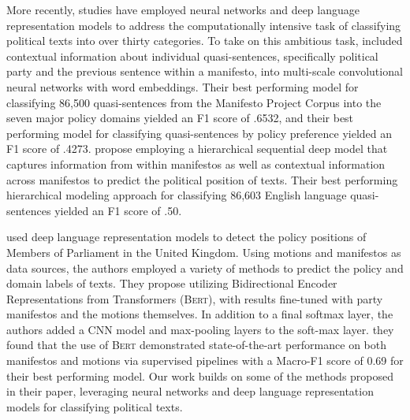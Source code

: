 \documentclass[11pt]{article}
\begin{document}

More recently, studies have employed neural networks and deep language representation models to address the computationally intensive task of classifying political texts into over thirty categories. To take on this ambitious task,  included contextual information about individual quasi-sentences, specifically political party and the previous sentence within a manifesto, into multi-scale convolutional neural networks with word embeddings. Their best performing model for classifying 86,500 quasi-sentences from the Manifesto Project Corpus into the seven major policy domains yielded an F1 score of .6532, and their best performing model for classifying quasi-sentences by policy preference yielded an F1 score of .4273.
 propose employing a hierarchical sequential deep model that captures information from within manifestos as well as contextual information across manifestos to predict the political position of texts. Their best performing hierarchical modeling approach for classifying 86,603 English language quasi-sentences yielded an F1 score of .50.


 used deep language representation models to detect the policy positions of Members of Parliament in the United Kingdom.
Using motions and manifestos as data sources, the authors employed a variety of methods to predict the policy and domain labels of texts.
They propose utilizing Bidirectional Encoder Representations from Transformers (\textsc{Bert}), with results fine-tuned with party manifestos and the motions themselves. In addition to a final softmax layer, the authors added a CNN model and max-pooling layers to the soft-max layer. they found that the use of \textsc{Bert} demonstrated state-of-the-art performance on both manifestos and motions via supervised pipelines with a Macro-F1 score of 0.69 for their best performing model.
Our work builds on some of the methods proposed in their paper, leveraging neural networks and deep language representation models for classifying political texts.
\end{document}
